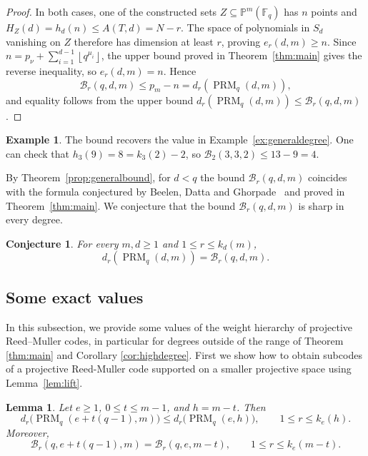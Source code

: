 \documentclass[11pt]{amsart}
\newtheorem{lemma}[theorem]{Lemma}
\newtheorem{conjecture}[theorem]{Conjecture}
\theoremstyle{definition}
\newtheorem{example}[theorem]{Example}
\newcommand{\F}{\mathbb F}
\newcommand{\PP}{\mathbb P}
\newcommand{\PRM}{\operatorname{PRM}}
\newcommand{\sq}[1]{\left\lfloor q^{#1}\right\rfloor}
\numberwithin{equation}{section}
\begin{document}
\begin{proof}
In both cases, one of the constructed sets $Z\subseteq\PP^m(\F_q)$
has $n$ points and $H_Z(d)=h_d(n)\le A(T,d)=N-r$.
The space of polynomials in $S_d$ vanishing on $Z$ therefore has
dimension at least $r$, proving $e_r(d,m)\ge n$.
Since $n=p_\nu+\sum_{i=1}^{d-1}\sq{\mu_i}$, the upper bound proved
in Theorem~\ref{thm:main} gives the reverse inequality, so
$e_r(d,m)=n$. Hence
\[
 \mathcal B_r(q,d,m)\le p_m-n=d_r(\PRM_q(d,m)),
\]
and equality follows from the upper bound $d_r(\PRM_q(d,m))\le\mathcal B_r(q,d,m)$.
\end{proof}

\begin{example}
   The bound recovers the value in Example~\ref{ex:generaldegree}. One can check that 
$h_3(9)=8=k_3(2)-2$, so
$\mathcal B_2(3,3,2)\le13-9=4$. 
\end{example}

By Theorem~\ref{prop:generalbound}, for $d<q$ the bound
$\mathcal B_r(q,d,m)$ coincides with the formula conjectured
by Beelen, Datta and Ghorpade~\cite[Conj.~2.4]{BDG22}
and proved in Theorem~\ref{thm:main}. We conjecture that the bound $\mathcal B_r(q,d,m)$
is sharp in every degree.

\begin{conjecture}\label{conj:general}
For every $m,d\ge1$ and $1\le r\le k_d(m)$,
\[
 d_r(\PRM_q(d,m))=\mathcal B_r(q,d,m).
\]
\end{conjecture}


\subsection{Some exact values}\label{subsec:lifts}
In this subsection, we provide some values of the weight hierarchy of projective Reed--Muller codes, in particular for degrees outside of the range of Theorem \ref{thm:main} and Corollary \ref{cor:highdegree}. 
First we show how to obtain subcodes of a projective Reed-Muller code supported on a smaller projective space using Lemma~\ref{lem:lift}.

\begin{lemma}\label{lem:generallifting}
Let $e\ge1$, $0\le t\le m-1$, and $h=m-t$. Then
\begin{equation}\label{eq:generallifting}
 d_r\bigl(\PRM_q(e+t(q-1),m)\bigr)
 \le d_r\bigl(\PRM_q(e,h)\bigr),
 \qquad 1\le r\le k_e(h).
\end{equation}
Moreover,
\[
 \mathcal B_r(q,e+t(q-1),m)=\mathcal B_r(q,e,m-t),
 \qquad 1\le r\le k_e(m-t).
\]
\end{lemma}
\end{document}
